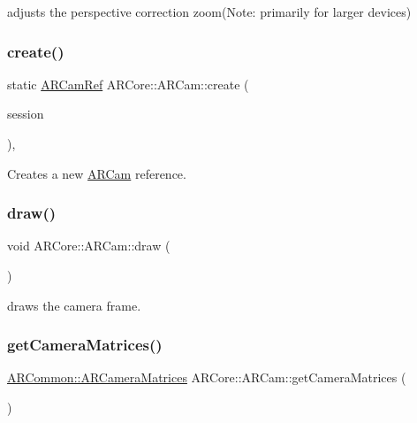 adjusts the perspective correction zoom(\+Note\+: primarily for larger devices) 

\mbox{\label{class_a_r_core_1_1_a_r_cam_ad4a6c0ebf786ea4e745cc8e95790681a}} 
\subsubsection{\texorpdfstring{create()}{create()}}
{\footnotesize\ttfamily static \hyperlink{namespace_a_r_core_a4ebe9e23907235fcf76bf65440fde0e0}{A\+R\+Cam\+Ref} A\+R\+Core\+::\+A\+R\+Cam\+::create (\begin{DoxyParamCaption}\item[{A\+R\+Session $\ast$}]{session }\end{DoxyParamCaption})\hspace{0.3cm}{\ttfamily [inline]}, {\ttfamily [static]}}



Creates a new \hyperlink{class_a_r_core_1_1_a_r_cam}{A\+R\+Cam} reference. 

\mbox{\label{class_a_r_core_1_1_a_r_cam_ac6506992ee88e0acd20d851849ebfa18}} 
\subsubsection{\texorpdfstring{draw()}{draw()}}
{\footnotesize\ttfamily void A\+R\+Core\+::\+A\+R\+Cam\+::draw (\begin{DoxyParamCaption}{ }\end{DoxyParamCaption})}



draws the camera frame. 

\mbox{\label{class_a_r_core_1_1_a_r_cam_a1398ffe9720425cfbc99635b08bc80d6}} 
\subsubsection{\texorpdfstring{get\+Camera\+Matrices()}{getCameraMatrices()}}
{\footnotesize\ttfamily \hyperlink{struct_a_r_common_1_1_a_r_camera_matrices}{A\+R\+Common\+::\+A\+R\+Camera\+Matrices} A\+R\+Core\+::\+A\+R\+Cam\+::get\+Camera\+Matrices (\begin{DoxyParamCaption}{ }\end{DoxyParamCaption})\hspace{0.3cm}{\ttfamily [inline]}}



